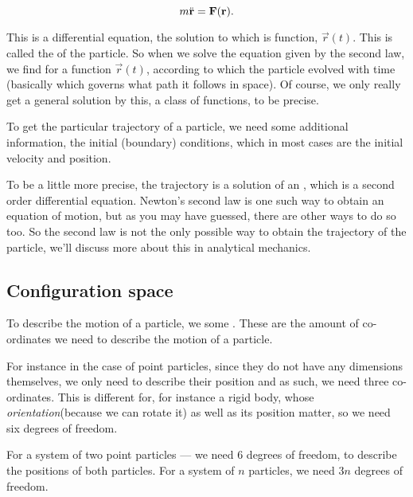 
\begin{equation*}
    m\ddot{\boldsymbol{\mathbf{r}}} = \boldsymbol{\mathbf{F}}(\boldsymbol{\mathbf{r}}).
\end{equation*}

This is a differential equation, the solution to which is function, \(\vec{r}(t)\). 
This is called the  of the particle. So when we solve the 
equation given by the second law, we find for a function \(\vec{r}(t)\), 
according to which the particle evolved with time (basically which governs 
what path it follows in space). Of course, we only really 
get a general solution by this, a class of functions, to be precise.

To get the particular trajectory of a particle, we need some additional information, 
the initial (boundary) conditions, which in most cases are the initial velocity and position.

To be a little more precise, the trajectory 
is a solution of an , which is a second order differential 
equation. Newton's second law is one such way to obtain an equation of motion, but 
as you may have guessed, there are other ways to do so too. So the second law is not 
the only possible way to obtain the trajectory of the particle, we'll discuss more 
about this in analytical mechanics.

\subsection{Configuration space}

To describe the motion of a particle, we some .
These are the amount of co-ordinates we need to describe the motion of a particle.

For instance in the case of point particles, since they do not have any dimensions themselves, 
we only need to describe their position and as such, we need three co-ordinates.
This is different for, for instance a rigid body, whose \emph{orientation}(because 
we can rotate it) as well as its position matter, so we need six degrees of freedom.

For a system of two point particles --- we need \(6\) degrees of freedom, 
to describe the positions of both particles. For a system of \(n\) particles, 
we need \(3n\) degrees of freedom.

